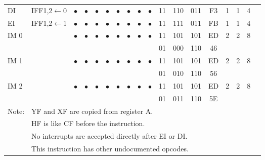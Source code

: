 \documentclass[oneside,a4paper]{book}
\newcommand{\instrt}{\rule{0pt}{2.7ex}}
\newcommand{\instrb}{\rule[-1.7ex]{0pt}{0pt}}
\newcommand{\notet}{\rule{0pt}{2.4ex}}
\newcommand{\noteb}{\rule[-1.3ex]{0pt}{0pt}}
\begin{document}
{\begin{tabular}{llcccccccccccccccl}
		DI\footnotemark[3]\instrt & 
			IFF1,2$\leftarrow$0 & 
			$\bullet$ & 
				$\bullet$ & 
				$\bullet$ & 
				$\bullet$ & 
				$\bullet$ & 
				$\bullet$ &
				$\bullet$ & 
				$\bullet$ &
			11 & 110 & 011 & 
			F3 & 1 & 
			1 & 4 & \instrb \\

		EI\footnotemark[3]\instrt & 
			IFF1,2$\leftarrow$1 & 
			$\bullet$ & 
				$\bullet$ & 
				$\bullet$ & 
				$\bullet$ & 
				$\bullet$ & 
				$\bullet$ & 
				$\bullet$ & 
				$\bullet$ &
			11 & 111 & 011 & 
			FB & 1 & 
			1 & 4 & \instrb \\

		IM 0\footnotemark[4]\instrt & & 
			$\bullet$ & $
				\bullet$ & 
				$\bullet$ & 
				$\bullet$ & 
				$\bullet$ & 
				$\bullet$ & 
				$\bullet$ & 
				$\bullet$ &
			11 & 101 & 101 & 
			ED & 2 & 
			2 & 8 & \\
		\multicolumn{10}{c}{} & 01 & 000 & 110 & 46 & \instrb \\

		IM 1\footnotemark[4]\instrt & & 
			$\bullet$ & 
				$\bullet$ & 
				$\bullet$ & 
				$\bullet$ & 
				$\bullet$ & 
				$\bullet$ & 
				$\bullet$ & 
				$\bullet$ &
			11 & 101 & 101 & 
			ED & 2 & 
			2 & 8 & \\
		\multicolumn{10}{c}{} & 01 & 010 & 110 & 56 & \instrb \\

		IM 2\footnotemark[4]\instrt & & 
			$\bullet$ & 
				$\bullet$ & 
				$\bullet$ & 
				$\bullet$ & 
				$\bullet$ & 
				$\bullet$ & 
				$\bullet$ & 
				$\bullet$ &
			11 & 101 & 101 & 
			ED & 2 & 
			2 & 8 & \\
		\multicolumn{10}{c}{} & 01 & 011 & 110 & 5E & \instrb \\
		
		\hline

		Note: 
			& \multicolumn{17}{l}{\parbox{12cm}{\footnotemark[1]YF and XF are copied from register A.}}\notet \\
			& \multicolumn{17}{l}{\parbox{12cm}{\footnotemark[2]HF is like CF before the instruction.}} \\
			& \multicolumn{17}{l}{\parbox{12cm}{\footnotemark[3]No interrupts are accepted directly after EI or DI.}} \\
			& \multicolumn{17}{l}{\parbox{12cm}{\footnotemark[4]This instruction has other undocumented opcodes.}}\noteb \\ 
	  
	\hline

	\end{tabular}
}
\end{document}
